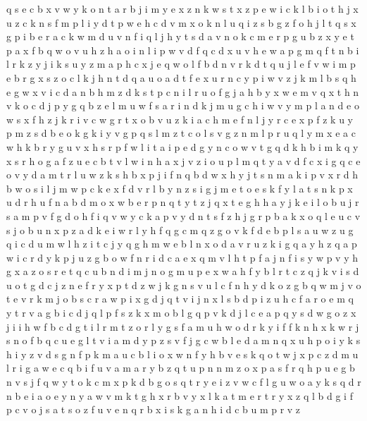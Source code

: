 \documentclass{article}
\begin{document}
q s e c b x v w y k o n t a r
b j i m y e x z n k w s
t x z p e w i
c k l b i o t h j x
u z c k n s f m p l i
y d t
p w e h c d v m x o k n l u q i z s b g
z f o h j l t q s x g p i b e r a c k w m d u v n
f i q l j h y t s d a v n o k c m e r p g u b z x
y e t p a x f b q w o v u h z
h a o i
n l i p w v d f q
c d x u v h e w a p g m q f t n b i l r k z y j
i k s u y z m a p h c x j e q w o l f b d n v r
k d t q u j l e f
v w i m p e b r g x s z o c l k j h n t d q a u
o a d t f e x u r n c y p i w v z j k m l b s q h
e g w x v i c d a n b h m
z d k s t p c n i l r u o f g j a h b y x w e m v q
x t h n v k o c d j p y g q b z e l m u w f s a r i
n d k j m u g c h i w v
y m p l a n d e o w s x f h z j k r i v c
w g r t x o b v u z k i a c h m e f n l j y
r c e x p f z k u y
p m z s d b e o k g
k i y v g p q s l m z
t c o l s v g z n m
l p r
u q l y m x e a c w h k b r
y g u v x h s r p f w l i t a
i p e
d g
y n c o w v t g q d k h b i
m k q y x s r h o g a f z u e c b t v l w i
n h a x j v z i o u p l m q t y
a v d f c x i
g q c e o v y d a m t r l u w z k s h b x p j i f n
q b d w x h y j t s n m a k i p
v x r d h b w o s i l j m
w p c k e
x f d v r l b y n z s i g j m e
t o e s k f y l
a t s n k p x u d
r h u f n a b
d m o x w b e r p n q t y
t z
j q x t e g h
h a y j k e i l o
b u j r s a m p v f g
d o h f i q v w y c k a p
v y d n t s f z h j g r p b a k x o q l e u c
v s j o b u n x p z a d k e i w r l y h f q g
c m q z g o v k f d e b p l s a u
w z u g q i c d
u m w l h z
i t c j y q g h m w e b l n x o d a v r u z k
i g q a
y h z q a p w i c r d
y k p j u z g b o w f n r i d c a e x q m v l h t
p f a
j n f i s y
w p v y h g x a z o s r e t q c u b n d i m j
n o g m u p e x w a h f y b l r t c z q j k v i s d
u o t g d c j z n e
f r y x p t d z w j k g n s v u l
c f n h y d k o z g b q w m j v
o t e v r
k m j o b s c r a w p i x g d
j
q t v i
j n x l s b d p i z u h c f a r o e m q y t
r v a g b i c d j q l p f s z k x m o
b l g q p v k d j
l c e a p q y s d w g o z x j i
i h w f b c d g
t i l
r
m t z o r
l y g s f a m u h w o d r k
y i f
f k n
h x k w r j s n o f b q c u e g l t v i a m d y p z
s v f j g c w b l e d a m n q x u h p o i y
k s h i
y z v d s g n f p k m a u c b l i o x w
n f y h b v e s k q o t w j x p c z d m u l r i g a
w e c q b i f u v a
m a r y b z q t u p n
n m z o x p a s f r q
h p u e g b n v s j f q w y t o k c
m x p k d b g o s q t r y e i z v w c f
l g u w o a y k s q d r n b e i
a o e y
n y a w v m k t g h x r
b v y x l k a t m e r
t r y x z q l b d g i f p c v o j s a
t s o z f u v e n q r b x i
s k g a n h i d c b u m p r v z
\end{document}
